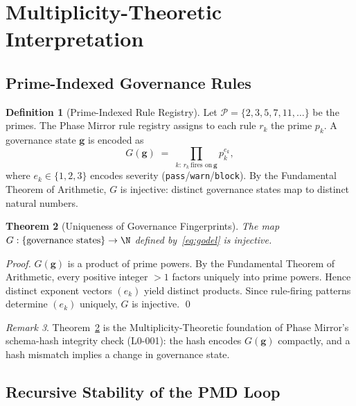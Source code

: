 \documentclass[12pt,a4paper]{article}
\newtheorem{theorem}{Theorem}[section]
\theoremstyle{definition}
\newtheorem{definition}[theorem]{Definition}
\theoremstyle{remark}
\newtheorem{remark}[theorem]{Remark}
\begin{document}
\section{Multiplicity-Theoretic Interpretation}
\label{sec:multiplicity}

\subsection{Prime-Indexed Governance Rules}

\begin{definition}[Prime-Indexed Rule Registry]
Let $\mathcal{P} = \{2,3,5,7,11,\dots\}$ be the primes.
The Phase Mirror rule registry assigns to each rule $r_k$ the prime $p_k$.
A governance state $\mathbf{g}$ is encoded as
\begin{equation}
  G(\mathbf{g}) \;=\; \prod_{k:\,r_k\,\text{fires on}\,\mathbf{g}} p_k^{e_k},
  \label{eq:godel}
\end{equation}
where $e_k\in\{1,2,3\}$ encodes severity (\texttt{pass}/\texttt{warn}/\texttt{block}).
By the Fundamental Theorem of Arithmetic, $G$ is injective: distinct governance
states map to distinct natural numbers.
\end{definition}

\begin{theorem}[Uniqueness of Governance Fingerprints]
\label{thm:godel}
The map $G: \{\text{governance states}\} \to \N$ defined by~\eqref{eq:godel} is
injective.
\end{theorem}

\begin{proof}
$G(\mathbf{g})$ is a product of prime powers.  By the Fundamental Theorem of
Arithmetic, every positive integer $>1$ factors uniquely into prime powers.
Hence distinct exponent vectors $(e_k)$ yield distinct products.  Since rule-firing
patterns determine $(e_k)$ uniquely, $G$ is injective. \qed
\end{proof}

\begin{remark}
Theorem~\ref{thm:godel} is the Multiplicity-Theoretic foundation of Phase Mirror's
schema-hash integrity check (L0-001): the hash encodes $G(\mathbf{g})$ compactly,
and a hash mismatch implies a change in governance state.
\end{remark}

\subsection{Recursive Stability of the PMD Loop}
\end{document}
